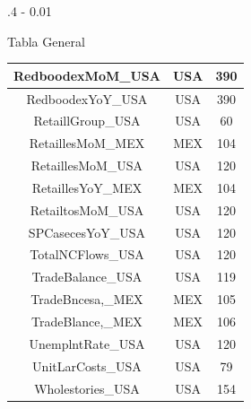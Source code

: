 \documentclass{iteraposter}\usepackage[]{graphicx}\usepackage[]{color}
\begin{document}
\begin{frame}
\begin{columns}[onlytextwidth]
\begin{column}{.4 \textwidth - 0.01\textwidth}
\begin{block}{Tabla General}
\begin{tabular}{c|c|c}
\hline
RedboodexMoM\_USA & USA & 390\\
\hline
RedboodexYoY\_USA & USA & 390\\
\hline
RetaillGroup\_USA & USA & 60\\
\hline
RetaillesMoM\_MEX & MEX & 104\\
\hline
RetaillesMoM\_USA & USA & 120\\
\hline
RetaillesYoY\_MEX & MEX & 104\\
\hline
RetailtosMoM\_USA & USA & 120\\
\hline
SPCasecesYoY\_USA & USA & 120\\
\hline
TotalNCFlows\_USA & USA & 120\\
\hline
TradeBalance\_USA & USA & 119\\
\hline
TradeBncesa,\_MEX & MEX & 105\\
\hline
TradeBlance,\_MEX & MEX & 106\\
\hline
UnemplntRate\_USA & USA & 120\\
\hline
UnitLarCosts\_USA & USA & 79\\
\hline
Wholestories\_USA & USA & 154\\
\hline
\end{tabular}


  \end{block}
\end{column}
  
\end{columns}



\end{frame}
\end{document}
